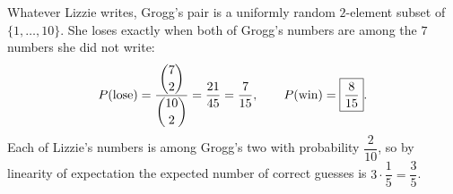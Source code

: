 Whatever Lizzie writes, Grogg's pair is a uniformly random $2$-element subset of $\{1,\dots,10\}$. She loses exactly when both of Grogg's numbers are among the $7$ numbers she did not write:
\[P(\text{lose})=\dfrac{\dbinom72}{\dbinom{10}{2}}=\dfrac{21}{45}=\dfrac{7}{15},\qquad P(\text{win})=\boxed{\dfrac{8}{15}}.\]
Each of Lizzie's numbers is among Grogg's two with probability $\dfrac{2}{10}$, so by linearity of expectation the expected number of correct guesses is $3\cdot\dfrac15=\boxed{\dfrac35}$.
